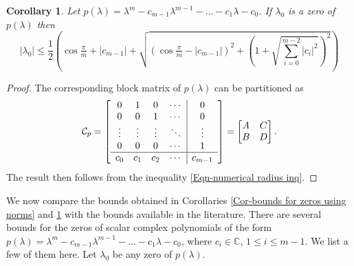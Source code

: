 \documentclass[12pt, reqno]{amsart}
\newtheorem{corollary}[theorem]{Corollary}
\theoremstyle{definition}
\theoremstyle{remark}
\numberwithin{equation}{section}
\begin{document}
\begin{corollary}\label{Cor-bounds on zeros using numerical range-2}
Let $p(\lambda) = \lambda^m -c_{m-1}\lambda^{m-1} - \dots -c_1 \lambda -c_0$. If 
$\lambda_0$ is a zero of $p(\lambda)$ then 
\begin{equation}
|\lambda_0| \leq \frac{1}{2} \left(\cos \tfrac{\pi}{m}+|c_{m-1}|+ 
\sqrt{(\cos \tfrac{\pi}{m}-|c_{m-1}|)^2 +\left(1+ \sqrt{\sum_{i=0}^{m-2}|c_i|^2} 
\right)^2} \right)
\end{equation} 
\end{corollary}
\begin{proof}
The corresponding block matrix of $p(\lambda)$ can be partitioned as 
\begin{equation}
\mathcal{C}_p = \begin{bmatrix}
\begin{array}{c c c c|c}
0 & 1 & 0 & \cdots & 0\\
0 & 0 & 1 & \cdots & 0\\
\vdots & \vdots & \vdots & \ddots & \vdots\\
0 & 0 & 0 & \cdots & 1\\
\hline
c_0 & c_1 & c_2 & \cdots & c_{m-1}\\
\end{array}
\end{bmatrix} = \begin{bmatrix}
A & C \\
B & D
\end{bmatrix}.
\end{equation} 
The result then follows from the inequality \eqref{Eqn-numerical radius inq}.  
\end{proof}

We now compare the bounds obtained in Corollaries \ref{Cor-bounds for zeros using norms} 
and \ref{Cor-bounds on zeros using numerical range-2} with the bounds available in 
the literature. There are several bounds for the zeros of scalar complex polynomials 
of the form $p(\lambda)=\lambda^m -c_{m-1}\lambda^{m-1} - \dots - c_1\lambda -c_0$, 
where $c_i \in \mathbb{C}$, $1 \leq i \leq m-1$. We list a few of them here. Let 
$\lambda_0$ be any zero of $p(\lambda)$.
\end{document}
